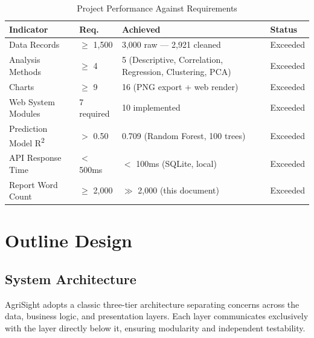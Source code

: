 \documentclass[12pt,a4paper]{report}
\begin{document}
\begin{table}[H]
  \centering
  \caption{Project Performance Against Requirements}
  \begin{tabular}{@{}p{2.8cm} p{2cm} p{6.5cm} p{2.3cm}@{}}
    \toprule
    \textbf{Indicator} & \textbf{Req.} & \textbf{Achieved} & \textbf{Status} \\
    \midrule
    Data Records            & $\ge$ 1,500    & 3,000 raw --- 2,921 cleaned & Exceeded \\
    Analysis Methods        & $\ge$ 4        & 5 (Descriptive, Correlation, Regression, Clustering, PCA) & Exceeded \\
    Charts                  & $\ge$ 9        & 16 (PNG export + web render) & Exceeded \\
    Web System Modules      & 7 required     & 10 implemented & Exceeded \\
    Prediction Model R\textsuperscript{2} & $>$ 0.50 & 0.709 (Random Forest, 100 trees) & Exceeded \\
    API Response Time       & $<$ 500ms     & $<$ 100ms (SQLite, local) & Exceeded \\
    Report Word Count       & $\ge$ 2,000   & $\gg$ 2,000 (this document) & Exceeded \\
    \bottomrule
  \end{tabular}
\end{table}

\newpage

\chapter{Outline Design}

\section{System Architecture}

AgriSight adopts a classic three-tier architecture separating concerns across the data, business logic, and presentation layers. Each layer communicates exclusively with the layer directly below it, ensuring modularity and independent testability.
\end{document}
